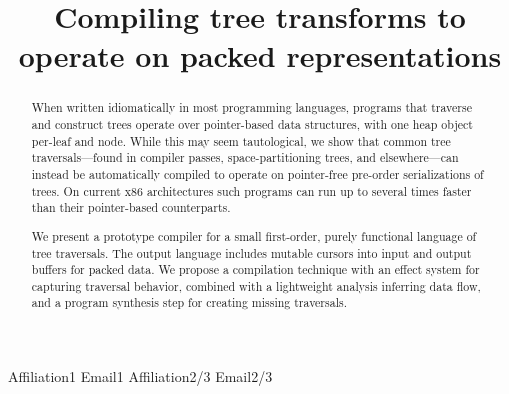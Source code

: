 \documentclass[preprint,10pt,nocopyrightspace,nonatbib]{./bibs/sigplanconf}
\begin{document}
\setlength{\pdfpageheight}{\paperheight}
\setlength{\pdfpagewidth}{\paperwidth}




\newcommand{\treelang}{TreeLang} %

\title{Compiling tree transforms to operate on packed representations}

           {Affiliation1}
           {Email1}
           {Affiliation2/3}
           {Email2/3}

\maketitle

\begin{abstract}
When written idiomatically in most programming languages, programs that traverse
and construct trees operate over pointer-based data structures, with one heap
object per-leaf and node.  While this may seem tautological, we show that common
tree traversals---found in compiler passes, space-partitioning trees, and
elsewhere---can instead be automatically compiled to operate on pointer-free
pre-order serializations of trees.  On current x86 architectures such programs
can run up to several times faster than their pointer-based counterparts.

We present a prototype compiler for a small first-order, purely functional
language of tree traversals.  The output language includes mutable cursors into
input and output buffers for packed data.  We propose a compilation technique
with an effect system for capturing traversal behavior, combined with a
lightweight analysis inferring data flow, and a program synthesis step for
creating missing traversals.
  
\end{abstract}

\end{document}
